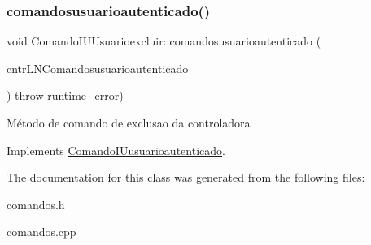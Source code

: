 \subsubsection{\texorpdfstring{comandosusuarioautenticado()}{comandosusuarioautenticado()}}
{\footnotesize\ttfamily void Comando\+I\+U\+Usuarioexcluir\+::comandosusuarioautenticado (\begin{DoxyParamCaption}\item[{\hyperlink{classILNComandosusuarioautenticado}{I\+L\+N\+Comandosusuarioautenticado} $\ast$}]{cntr\+L\+N\+Comandosusuarioautenticado }\end{DoxyParamCaption}) throw  runtime\+\_\+error) \hspace{0.3cm}{\ttfamily [virtual]}}

Método de comando de exclusao da controladora 

Implements \hyperlink{classComandoIUusuarioautenticado}{Comando\+I\+Uusuarioautenticado}.



The documentation for this class was generated from the following files\+:\begin{DoxyCompactItemize}
\item 
comandos.\+h\item 
comandos.\+cpp\end{DoxyCompactItemize}
